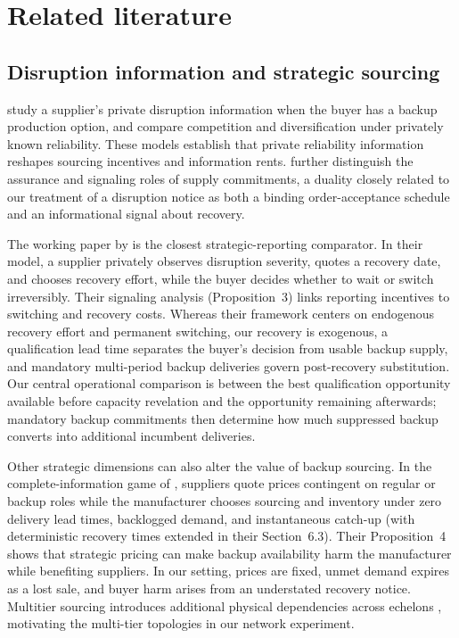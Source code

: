 \documentclass[preprint,11pt,authoryear]{elsarticle}
\begin{document}
\section{Related literature}\label{sec:literature}
\subsection{Disruption information and strategic sourcing}
\citet{yang2009} study a supplier's private disruption information when the buyer has a backup production option, and \citet{yang2012} compare competition and diversification under privately known reliability. These models establish that private reliability information reshapes sourcing incentives and information rents. \citet{gumus2012} further distinguish the assurance and signaling roles of supply commitments, a duality closely related to our treatment of a disruption notice as both a binding order-acceptance schedule and an informational signal about recovery.

The working paper by \citet{yangMurthy2014} is the closest strategic-reporting comparator. In their model, a supplier privately observes disruption severity, quotes a recovery date, and chooses recovery effort, while the buyer decides whether to wait or switch irreversibly. Their signaling analysis (Proposition~3) links reporting incentives to switching and recovery costs. Whereas their framework centers on endogenous recovery effort and permanent switching, our recovery is exogenous, a qualification lead time separates the buyer's decision from usable backup supply, and mandatory multi-period backup deliveries govern post-recovery substitution. Our central operational comparison is between the best qualification opportunity available before capacity revelation and the opportunity remaining afterwards; mandatory backup commitments then determine how much suppressed backup converts into additional incumbent deliveries.

Other strategic dimensions can also alter the value of backup sourcing. In the complete-information game of \citet{demirel2018}, suppliers quote prices contingent on regular or backup roles while the manufacturer chooses sourcing and inventory under zero delivery lead times, backlogged demand, and instantaneous catch-up (with deterministic recovery times extended in their Section~6.3). Their Proposition~4 shows that strategic pricing can make backup availability harm the manufacturer while benefiting suppliers. In our setting, prices are fixed, unmet demand expires as a lost sale, and buyer harm arises from an understated recovery notice. Multitier sourcing introduces additional physical dependencies across echelons \citep{ang2017}, motivating the multi-tier topologies in our network experiment.
\end{document}
